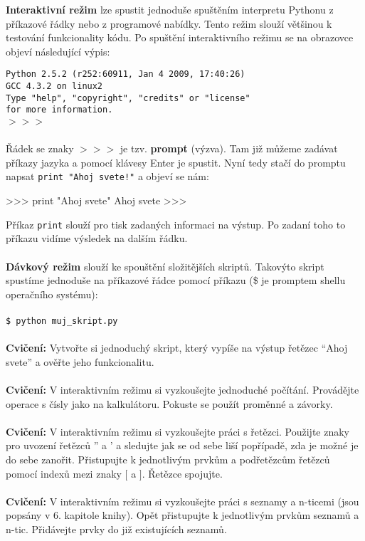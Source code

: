 {\textbf{Interaktivní režim}} lze spustit jednoduše spuštěním interpretu Pythonu z příkazové řádky nebo z programové nabídky. Tento režim slouží většinou k testování funkcionality kódu. Po spuštění interaktivního režimu se na obrazovce objeví následující výpis:

\newpage
\noindent
{\texttt{Python 2.5.2 (r252:60911, Jan  4 2009, 17:40:26) \\
GCC 4.3.2 on linux2\\
Type "help", "copyright", "credits" or "license"\\
for more information.\\
$>>>$
}}
\\
\\
\noindent
Řádek se znaky {\texttt{$>>>$}} je tzv. \textbf{prompt} (výzva). Tam již můžeme zadávat příkazy jazyka a pomocí klávesy Enter je spustit.
Nyní tedy stačí do promptu napsat {\texttt{print "Ahoj svete!"}} a objeví se nám:

\begin{python}
>>> print "Ahoj svete"
Ahoj svete
>>> 
\end{python}

\noindent
Příkaz {\texttt{print}} slouží pro tisk zadaných informaci na výstup. Po zadaní toho to příkazu vidíme výsledek na dalším řádku.
\\
\\
\noindent
{\textbf{Dávkový režim}} slouží ke spouštění složitějších skriptů. Takovýto skript spustíme jednoduše na příkazové řádce pomocí příkazu (\$ je promptem shellu operačního systému):
\\
\\
\noindent
{\texttt{\$ python muj\_skript.py}}
\\
\\
\noindent
{\textbf{Cvičení:}}
Vytvořte si jednoduchý skript, který vypíše na výstup řetězec ``Ahoj svete'' a ověřte jeho funkcionalitu.
\\
\\
\noindent
{\textbf{Cvičení:}}
V interaktivním režimu si vyzkoušejte jednoduché počítání. Provádějte operace s čísly jako na kalkulátoru. Pokuste se použít proměnné a závorky.
\\
\\
\noindent
{\textbf{Cvičení:}}
V interaktivním režimu si vyzkoušejte práci s řetězci. Použijte znaky pro uvození řetězců '' a ' a sledujte jak se od sebe liší popřípadě, zda je možné je do sebe zanořit. Přistupujte k jednotlivým prvkům a podřetězcům řetězců pomocí indexů mezi znaky $[$ a $]$. Řetězce spojujte.
\\
\\
\noindent
{\textbf{Cvičení:}}
V interaktivním režimu si vyzkoušejte práci s seznamy a n-ticemi (jsou popsány v 6. kapitole knihy). Opět přistupujte k jednotlivým prvkům seznamů a n-tic. Přidávejte prvky do již existujících seznamů.

